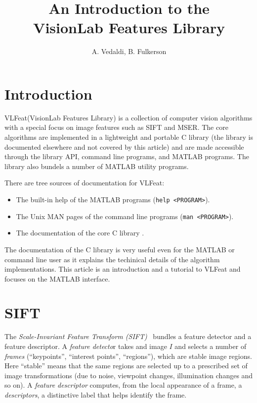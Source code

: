 \documentclass[9.5pt]{article}
\title{An Introduction to the\\ VisionLab Features Library}
\author{A. Vedaldi, B. Fulkerson}
\newcommand{\VLFeat}{{\sc VLFeat}\xspace}
\begin{document}

\ifpdf\twocolumn\fi
\maketitle{}
\ifpdf\tableofcontents{}\fi

\section{Introduction}\label{intro}

\VLFeat (VisionLab Features Library) is a collection of computer
vision algorithms with a special focus on image features such as SIFT
and MSER. The core algorithms are implemented in a lightweight and
portable C library (the library is documented elsewhere and not
covered by this article) and are made accessible through the library
API, command line programs, and MATLAB programs. The library also
bundels a number of MATLAB utility programs.

There are tree sources of documentation for \VLFeat:
\begin{itemize}\raggedright
\item The built-in help of the MATLAB programs (\verb$help <PROGRAM>$).
\item The Unix MAN pages of the command line programs
  (\verb$man <PROGRAM>$).
\item The documentation of the core C library \cite{}.
\end{itemize}
The documentation of the C library is very useful even for the MATLAB
or command line user as it explains the techinical details of the
algorithm implementations.  This article is an introduction and a
tutorial to \VLFeat and focuses on the MATLAB interface.


\section{SIFT}\label{sift}

The {\em Scale-Invariant Feature Transform
  (SIFT)}~\cite{lowe04distinctive} bundles a feature detector and a
feature descriptor. A {\em feature detecto}r takes and image $I$ and
selects a number of {\em frames} (``keypoints'', ``interest points'',
``regions''), which are stable image regions. Here ``stable'' means
that the same regions are selected up to a prescribed set of image
transformations (due to noise, viewpoint changes, illumination changes
and so on). A {\em feature descriptor} computes, from the local
appearance of a frame, a {\em descriptors}, a distinctive label that
helps identify the frame.
\end{document}
